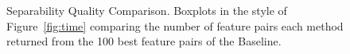 \begin{figure}[h]
\centering %
\vspace{-5mm}
\vspace{-5mm}
\caption{Separability Quality Comparison. Boxplots in the style of Figure~\ref{fig:time} comparing the number of feature pairs each method returned from the 100 best feature pairs of the Baseline.}
\vspace{-5mm}
\label{fig:separability}
\end{figure}

